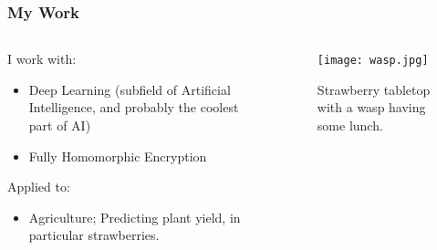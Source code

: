 \documentclass[aspectratio=169]{beamer}
\begin{document}
  \begin{frame}
    \frametitle{My Work}
    \begin{columns}
      \begin{column}{0.5\textwidth}
        I work with:
        \begin{itemize}
          \item Deep Learning (subfield of Artificial Intelligence, and probably the coolest part of AI)
          \item Fully Homomorphic Encryption
        \end{itemize}
        Applied to:
        \begin{itemize}
          \item Agriculture; Predicting plant yield, in particular strawberries.
        \end{itemize}
      \end{column}
      \begin{column}{0.5\textwidth}
        \begin{figure}[th!]
          \centering
          \texttt{[image: wasp.jpg]}
          \caption{Strawberry tabletop with a wasp having some lunch.}
          \label{fig:wasp}
        \end{figure}
      \end{column}

    \end{columns}
  \end{frame}
\end{document}
